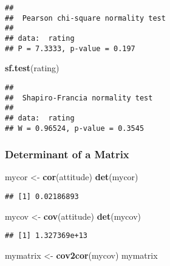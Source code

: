 \documentclass[]{article}
\newenvironment{Shaded}{\begin{snugshade}}{\end{snugshade}}
\newcommand{\KeywordTok}[1]{\textcolor[rgb]{0.13,0.29,0.53}{\textbf{#1}}}
\newcommand{\StringTok}[1]{\textcolor[rgb]{0.31,0.60,0.02}{#1}}
\newcommand{\NormalTok}[1]{#1}
\begin{document}
\begin{verbatim}
## 
##  Pearson chi-square normality test
## 
## data:  rating
## P = 7.3333, p-value = 0.197
\end{verbatim}

\begin{Shaded}
\begin{Highlighting}[]
\KeywordTok{sf.test}\NormalTok{(rating)}
\end{Highlighting}
\end{Shaded}

\begin{verbatim}
## 
##  Shapiro-Francia normality test
## 
## data:  rating
## W = 0.96524, p-value = 0.3545
\end{verbatim}

\subsubsection{Determinant of a Matrix}\label{determinant-of-a-matrix}

\begin{Shaded}
\begin{Highlighting}[]
\NormalTok{mycor <-}\StringTok{ }\KeywordTok{cor}\NormalTok{(attitude)}
\KeywordTok{det}\NormalTok{(mycor)}
\end{Highlighting}
\end{Shaded}

\begin{verbatim}
## [1] 0.02186893
\end{verbatim}

\begin{Shaded}
\begin{Highlighting}[]
\NormalTok{mycov <-}\StringTok{ }\KeywordTok{cov}\NormalTok{(attitude)}
\KeywordTok{det}\NormalTok{(mycov)}
\end{Highlighting}
\end{Shaded}

\begin{verbatim}
## [1] 1.327369e+13
\end{verbatim}

\begin{Shaded}
\begin{Highlighting}[]
\NormalTok{mymatrix <-}\StringTok{ }\KeywordTok{cov2cor}\NormalTok{(mycov)}
\NormalTok{mymatrix}
\end{Highlighting}
\end{Shaded}
\end{document}
